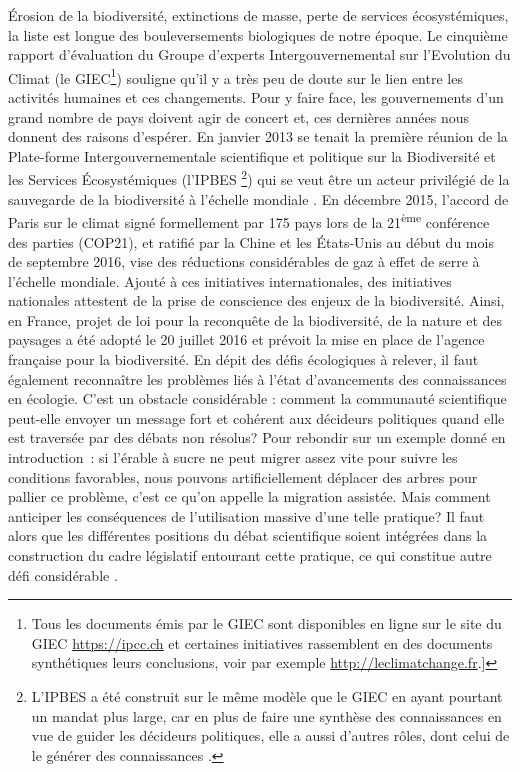Érosion de la biodiversité, extinctions de masse, perte de services
écosystémiques, la liste est longue des bouleversements biologiques de
notre époque. Le cinquième rapport d'évaluation du Groupe d'experts
Intergouvernemental sur l'Evolution du Climat (le GIEC\footnote{Tous les
  documents émis par le GIEC sont disponibles en ligne sur le site du
  GIEC \url{https://ipcc.ch} et certaines initiatives rassemblent en des
  documents synthétiques leurs conclusions, voir par exemple
  \url{http://leclimatchange.fr}.{]}}) souligne qu'il y a très peu de
doute sur le lien entre les activités humaines et ces changements. Pour
y faire face, les gouvernements d'un grand nombre de pays doivent agir
de concert et, ces dernières années nous donnent des raisons d'espérer.
En janvier 2013 se tenait la première réunion de la Plate-forme
Intergouvernementale scientifique et politique sur la Biodiversité et
les Services Écosystémiques (l'IPBES \footnote{L'IPBES a été construit
  sur le même modèle que le GIEC en ayant pourtant un mandat plus large,
  car en plus de faire une synthèse des connaissances en vue de guider
  les décideurs politiques, elle a aussi d'autres rôles, dont celui de
  le générer des connaissances \citep{Brooks2014}.}) qui se veut être un
acteur privilégié de la sauvegarde de la biodiversité à l'échelle
mondiale \citep{Diaz2015a}. En décembre 2015, l'accord de Paris sur le
climat signé formellement par 175 pays lors de la
21\textsuperscript{ème} conférence des parties (COP21), et ratifié par
la Chine et les États-Unis au début du mois de septembre 2016, vise des
réductions considérables de gaz à effet de serre à l'échelle mondiale.
Ajouté à ces initiatives internationales, des initiatives nationales
attestent de la prise de conscience des enjeux de la biodiversité.
Ainsi, en France, projet de loi pour la reconquête de la biodiversité,
de la nature et des paysages a été adopté le 20 juillet 2016 et prévoit
la mise en place de l'agence française pour la biodiversité. En dépit
des défis écologiques à relever, il faut également reconnaître les
problèmes liés à l'état d'avancements des connaissances en écologie.
C'est un obstacle considérable : comment la communauté scientifique
peut-elle envoyer un message fort et cohérent aux décideurs politiques
quand elle est traversée par des débats non résolus? Pour rebondir sur
un exemple donné en introduction~: si l'érable à sucre ne peut migrer
assez vite pour suivre les conditions favorables, nous pouvons
artificiellement déplacer des arbres pour pallier ce problème, c'est ce
qu'on appelle la migration assistée. Mais comment anticiper les
conséquences de l'utilisation massive d'une telle pratique? Il faut
alors que les différentes positions du débat scientifique soient
intégrées dans la construction du cadre législatif entourant cette
pratique, ce qui constitue autre défi considérable
\citep{McLachlan2007}.

